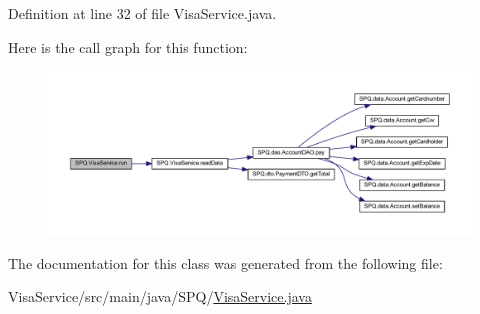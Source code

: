 Definition at line 32 of file Visa\+Service.\+java.

Here is the call graph for this function\+:\nopagebreak
\begin{figure}[H]
\begin{center}
\leavevmode
\includegraphics[width=350pt]{class_s_p_q_1_1_visa_service_a4e9434dfb98d1ff247d29794ac96909e_cgraph}
\end{center}
\end{figure}


The documentation for this class was generated from the following file\+:\begin{DoxyCompactItemize}
\item 
Visa\+Service/src/main/java/\+S\+P\+Q/\mbox{\hyperlink{_visa_service_8java}{Visa\+Service.\+java}}\end{DoxyCompactItemize}
